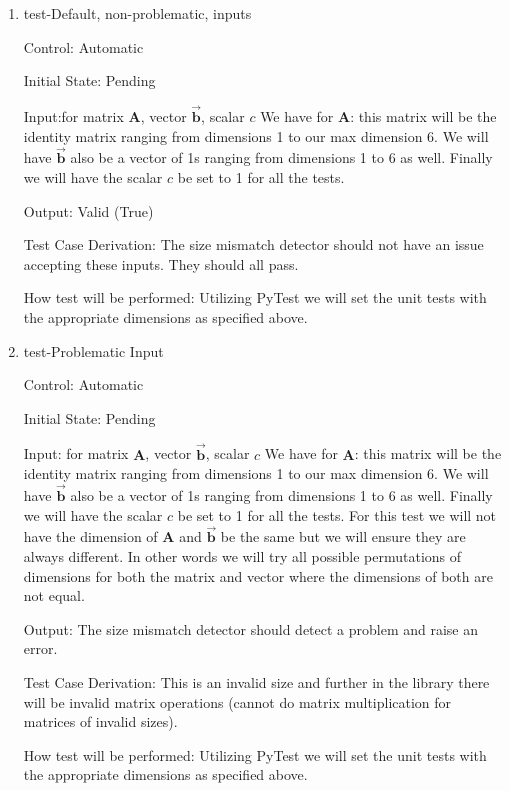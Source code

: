 \documentclass[12pt, titlepage]{article}
\begin{document}
\begin{enumerate}

\item{test-Default, non-problematic, inputs\\}

Control: Automatic
					
Initial State: Pending  
					
Input:for matrix $\mathbf{A}$, vector $\mathbf{\vec{b}}$, scalar $c$
We have for $\mathbf{A}$: this matrix will be the identity matrix ranging 
from dimensions 1 to our max dimension 6. We will have $\mathbf{\vec{b}}$
also be a vector of 1s ranging from dimensions 1 to 6 as well. Finally we 
will have the scalar $c$ be set to 1 for all the tests. 
					
Output: Valid (True)  

Test Case Derivation: The size mismatch detector should not have an issue accepting these
inputs. They should all pass. 
					
How test will be performed: Utilizing PyTest we will set the unit tests with the
appropriate dimensions as specified above. 
					
\item{test-Problematic Input\\}

Control: Automatic
					
Initial State: Pending
					
Input: for matrix $\mathbf{A}$, vector $\mathbf{\vec{b}}$, scalar $c$
We have for $\mathbf{A}$: this matrix will be the identity matrix ranging 
from dimensions 1 to our max dimension 6. We will have $\mathbf{\vec{b}}$
also be a vector of 1s ranging from dimensions 1 to 6 as well. Finally we 
will have the scalar $c$ be set to 1 for all the tests. For this test we 
will not have the dimension of $\mathbf{A}$ and $\mathbf{\vec{b}}$ be the same
but we will ensure they are always different. In other words we will try all 
possible permutations of dimensions for both the matrix and vector where the
dimensions of both are not equal.
					
Output: The size mismatch detector should detect a problem and raise an error. 

Test Case Derivation: This is an invalid size and further in the library there will be invalid 
matrix operations (cannot do matrix multiplication for matrices of invalid sizes). 

How test will be performed: Utilizing PyTest we will set the unit tests with the
appropriate dimensions as specified above.

\end{enumerate}
\end{document}
